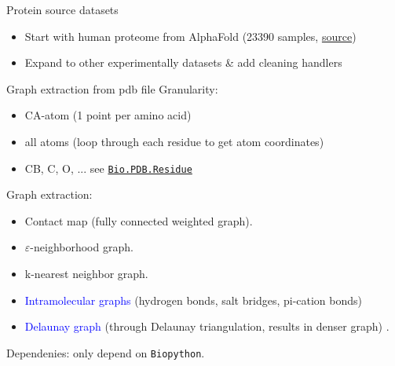 \documentclass[aspectratio=169, 10pt, dvipsnames, handout]{beamer}
\begin{document}
\begin{frame}[fragile]{Protein source datasets}
  \begin{itemize}
  \item Start with human proteome from AlphaFold (23390 samples,
    \href{https://ftp.ebi.ac.uk/pub/databases/alphafold/latest/UP000005640_9606_HUMAN_v2.tar}{source})
  \item Expand to other experimentally datasets \& add cleaning handlers
  \end{itemize}
\end{frame}

\begin{frame}[fragile]{Graph extraction from pdb file}
  Granularity:
  \begin{itemize}
  \item CA-atom (1 point per amino acid)
  \item all atoms (loop through each residue to get atom coordinates)
  \item CB, C, O, ... see \href{https://biopython.org/docs/1.75/api/Bio.PDB.Residue.html}{\texttt{Bio.PDB.Residue}}
  \end{itemize}
  Graph extraction:
  \begin{itemize}
  \item Contact map (fully connected weighted graph).
  \item $\varepsilon$-neighborhood graph. \cite{anastasiu2016algorithms}
  \item k-nearest neighbor graph. \cite{zhao2021approximate}
  \item \textcolor{blue}{Intramolecular graphs} (hydrogen bonds, salt bridges, pi-cation bonds)
  \item \textcolor{blue}{Delaunay graph} (through Delaunay triangulation,
    results in denser graph) \cite{taylor2006graph}.

  \end{itemize}

  Dependenies: only depend on \texttt{Biopython}.

  \endminipage
  \hfill\vline\hfill
  \endminipage
  \begin{figure}[center]
    \centering
    \begin{tikzpicture}[align=center, node distance=1cm, align=center]


\end{tikzpicture}
\end{figure}
\end{frame}
\end{document}
